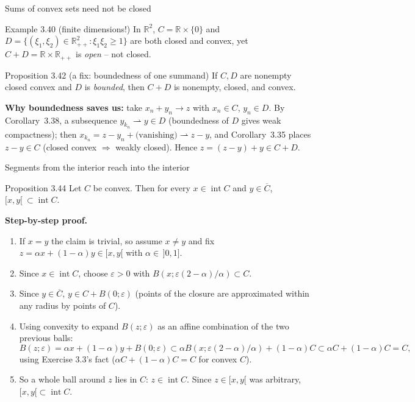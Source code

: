 \documentclass[aspectratio=169,10pt]{beamer}
\newcommand{\R}{\mathbb{R}}
\newcommand{\Rpp}{\mathbb{R}_{++}}
\begin{document}
\begin{frame}{Sums of convex sets need not be closed}
  \begin{block}{Example 3.40 (finite dimensions!)}
    In $\R^2$, $C=\R\times\{0\}$ and $D=\{(\xi_1,\xi_2)\in\R_{++}^2 :
    \xi_1\xi_2\ge 1\}$ are both closed and convex, yet
    $C+D = \R\times\Rpp$ is \emph{open} -- not closed.
  \end{block}
  \begin{block}{Proposition 3.42 (a fix: boundedness of one summand)}
    If $C,D$ are nonempty closed convex and $D$ is \emph{bounded}, then
    $C+D$ is nonempty, closed, and convex.
  \end{block}
  \textbf{Why boundedness saves us:} take $x_n+y_n\to z$ with $x_n\in C$,
  $y_n\in D$. By Corollary~3.38, a subsequence $y_{k_n}\rightharpoonup y\in
  D$ (boundedness of $D$ gives weak compactness); then $x_{k_n}=z-y_n
  +\text{(vanishing)} \rightharpoonup z-y$, and Corollary~3.35 places
  $z-y\in C$ (closed convex $\Rightarrow$ weakly closed). Hence
  $z=(z-y)+y\in C+D$.
\end{frame}

\begin{frame}{Segments from the interior reach into the interior}
  \begin{block}{Proposition 3.44}
    Let $C$ be convex. Then for every $x\in\operatorname{int}C$ and
    $y\in\overline C$, $[x,y[\ \subset \operatorname{int}C$.
  \end{block}
  \textbf{Step-by-step proof.}
  \begin{enumerate}
    \item If $x=y$ the claim is trivial, so assume $x\ne y$ and fix
      $z=\alpha x+(1-\alpha)y \in [x,y[$ with $\alpha\in\,]0,1]$.
    \item Since $x\in\operatorname{int}C$, choose $\varepsilon>0$ with
      $B(x;\varepsilon(2-\alpha)/\alpha)\subset C$.
    \item Since $y\in\overline C$, $y\in C+B(0;\varepsilon)$ (points of the
      closure are approximated within any radius by points of $C$).
    \item Using convexity to expand $B(z;\varepsilon)$ as an affine
      combination of the two previous balls:
      \[
        B(z;\varepsilon) = \alpha x+(1-\alpha)y+B(0;\varepsilon)
        \subset \alpha B(x;\varepsilon(2-\alpha)/\alpha) + (1-\alpha)C
        \subset \alpha C + (1-\alpha)C = C,
      \]
      using Exercise 3.3's fact ($\alpha C+(1-\alpha)C=C$ for convex $C$).
    \item So a whole ball around $z$ lies in $C$: $z\in\operatorname{int}C$.
      Since $z\in[x,y[$ was arbitrary, $[x,y[\subset\operatorname{int}C$.
      \qedhere
  \end{enumerate}
\end{frame}
\end{document}

